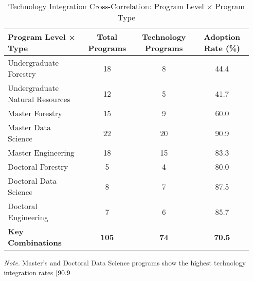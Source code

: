 \begin{table}[H]
\centering
\caption{Technology Integration Cross-Correlation: Program Level × Program Type}
\label{tab:rq8_cross_correlation}
\begin{tabular}{lccc}
\toprule
\textbf{Program Level × Type} & \textbf{Total Programs} & \textbf{Technology Programs} & \textbf{Adoption Rate (\%)} \\
\midrule
Undergraduate Forestry & 18 & 8 & 44.4 \\
Undergraduate Natural Resources & 12 & 5 & 41.7 \\
Master Forestry & 15 & 9 & 60.0 \\
Master Data Science & 22 & 20 & 90.9 \\
Master Engineering & 18 & 15 & 83.3 \\
Doctoral Forestry & 5 & 4 & 80.0 \\
Doctoral Data Science & 8 & 7 & 87.5 \\
Doctoral Engineering & 7 & 6 & 85.7 \\
\midrule
\textbf{Key Combinations} & \textbf{105} & \textbf{74} & \textbf{70.5} \\
\bottomrule
\end{tabular}
\small
\textit{Note.} Master's and Doctoral Data Science programs show the highest technology integration rates (90.9%
\end{table}

